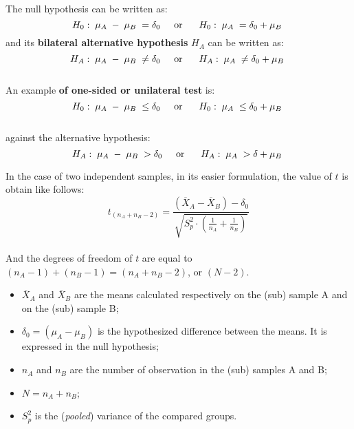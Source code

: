 \begin{frame}
  \vspace*{.25cm}
  The null hypothesis can be written as:
  $$ H_0: \; \mu_A \; - \; \mu_B \; = \delta_0 \mbox {\hspace*{.5cm}or\hspace*{.5cm}} \; H_0: \; \mu_A \; = \delta_0 + \mu_B \; $$
  and its \textbf{bilateral alternative hypothesis } $ H_A $ can be written as:\\
  $$ H_A: \; \mu_A \; - \; \mu_B \; \neq \delta_0 \mbox{\hspace*{.5cm}or\hspace*{.5cm}} \; H_A: \; \mu_A\; \neq \delta_0 +\mu_B \; $$ \\
  \vspace*{.5cm}
  An example \textbf{of  one-sided or unilateral test} is:
  $$ H_0: \; \mu_A \; - \; \mu_B \; \leq \delta_0 \mbox{\hspace*{.5cm}or\hspace*{.5cm}} \; H_0: \; \mu_A \; \leq \delta_0 + \mu_B \; $$ \\
  \vspace*{.25cm}
  against the alternative hypothesis:
  $$ H_A: \; \mu_A \; - \; \mu_B \; > \delta_0 \mbox{\hspace*{.5cm}or\hspace*{.5cm}} \; H_A: \; \mu_A \; > \delta + \mu_B\; $$
\end{frame}

\begin{frame}
  \begin{small}
    \vspace*{.25cm}
    In the case of two independent samples, in its easier formulation, the value of $ t $ is obtain like follows:
    $$ t_{(n_A+n_B-2)} = \frac{(\overline{X}_A-\overline{X}_B)-\delta_0}{\sqrt{S^2_p \cdot (\frac{1}{n_A}+\frac{1}{n_B})}} $$ \\
    \vspace*{.25cm}
    And the degrees of freedom of $ t $  are equal to $ (n_A-1)+(n_B-1)=(n_A+n_B-2)$, or $(N-2) $.\\
    \vspace*{.15cm}
    \begin{itemize}
      \item $ \overline{X}_A $ and $ \overline{X}_B $ are the means calculated respectively on the (sub) sample A and on the (sub) sample B;
      \item $ \delta_0 = (\mu_A - \mu_B) $ is the hypothesized difference between the means. It is expressed in the null hypothesis;
      \item $ n_A $ and $ n_B $ are the number of observation in the (sub) samples A and B;
      \item $ N = n_A + n_B $;
      \item $ S^2_p $ is the (\textit{pooled}) variance of the compared groups.
   \end{itemize}
  \end{small}
\end{frame}

